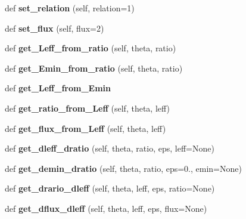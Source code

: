 \begin{DoxyCompactItemize}
def {\bfseries set\+\_\+relation} (self, relation=1)
\item 
\mbox{\label{classMIS_1_1DataFactory_1_1PhysModel_1_1PhysModel_ab524954476e001dab6420b9699f869e8}} 
def {\bfseries set\+\_\+flux} (self, flux=2)
\item 
\mbox{\label{classMIS_1_1DataFactory_1_1PhysModel_1_1PhysModel_aa6667ff00c6e4d57ff39ded5d3d079f7}} 
def {\bfseries get\+\_\+\+Leff\+\_\+from\+\_\+ratio} (self, theta, ratio)
\item 
\mbox{\label{classMIS_1_1DataFactory_1_1PhysModel_1_1PhysModel_af57096c52704aef9fec736a9cd3dc085}} 
def {\bfseries get\+\_\+\+Emin\+\_\+from\+\_\+ratio} (self, theta, ratio)
\item 
\mbox{\label{classMIS_1_1DataFactory_1_1PhysModel_1_1PhysModel_a44f1911e38db0bf61c71e9d99e7ab532}} 
def {\bfseries get\+\_\+\+Leff\+\_\+from\+\_\+\+Emin}
\item 
\mbox{\label{classMIS_1_1DataFactory_1_1PhysModel_1_1PhysModel_a4f63ca23ff3785e09bdce92bf80c4db0}} 
def {\bfseries get\+\_\+ratio\+\_\+from\+\_\+\+Leff} (self, theta, leff)
\item 
\mbox{\label{classMIS_1_1DataFactory_1_1PhysModel_1_1PhysModel_a79970a5d53478e00274a2cdaf7767ab1}} 
def {\bfseries get\+\_\+flux\+\_\+from\+\_\+\+Leff} (self, theta, leff)
\item 
\mbox{\label{classMIS_1_1DataFactory_1_1PhysModel_1_1PhysModel_a97a55a51a61e60b89d5e30c1cbefc9dc}} 
def {\bfseries get\+\_\+dleff\+\_\+dratio} (self, theta, ratio, eps, leff=None)
\item 
\mbox{\label{classMIS_1_1DataFactory_1_1PhysModel_1_1PhysModel_a7745909e8ada2977ea985584472fb127}} 
def {\bfseries get\+\_\+demin\+\_\+dratio} (self, theta, ratio, eps=0., emin=None)
\item 
\mbox{\label{classMIS_1_1DataFactory_1_1PhysModel_1_1PhysModel_a79107f3af277f57efad2660a8c66da39}} 
def {\bfseries get\+\_\+drario\+\_\+dleff} (self, theta, leff, eps, ratio=None)
\item 
\mbox{\label{classMIS_1_1DataFactory_1_1PhysModel_1_1PhysModel_a677c009990c33fbd73d2ba5a357db956}} 
def {\bfseries get\+\_\+dflux\+\_\+dleff} (self, theta, leff, eps, flux=None)
\end{DoxyCompactItemize}
